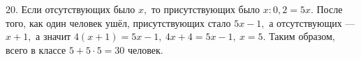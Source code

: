 20. Если отсутствующих было $x,$ то присутствующих было $x:0,2=5x.$ После того, как один человек ушёл, присутствующих стало $5x-1,$ а отсутствующих --- $x+1,$ а значит $4(x+1)=5x-1,\ 4x+4=5x-1,\ x=5.$ Таким образом, всего в классе $5+5\cdot5=30$ человек.\\
